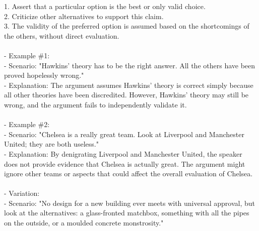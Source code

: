 \documentclass[a4paper,12pt,single,pdftex]{scrbook}
\begin{document}
    
        1. Assert that a particular option is the best or only valid choice.
    \\

    
        2. Criticize other alternatives to support this claim.
    \\

    
        3. The validity of the preferred option is assumed based on the shortcomings of the others, without direct evaluation.
    \\

    
      
    \\

    
      - Example \#1:
    \\

    
        - Scenario: "Hawkins’ theory has to be the right answer. All the others have been proved hopelessly wrong."
    \\

    
        - Explanation: The argument assumes Hawkins' theory is correct simply because all other theories have been discredited. However, Hawkins’ theory may still be wrong, and the argument fails to independently validate it.
    \\

    
      
    \\

    
      - Example \#2:
    \\

    
        - Scenario: "Chelsea is a really great team. Look at Liverpool and Manchester United; they are both useless."
    \\

    
        - Explanation: By denigrating Liverpool and Manchester United, the speaker does not provide evidence that Chelsea is actually great. The argument might ignore other teams or aspects that could affect the overall evaluation of Chelsea.
    \\

    
      
    \\

    
      - Variation:
    \\

    
        - Scenario: "No design for a new building ever meets with universal approval, but look at the alternatives: a glass-fronted matchbox, something with all the pipes on the outside, or a moulded concrete monstrosity."
    \\
\end{document}
